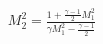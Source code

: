 \documentclass[10pt]{article}
\begin{document}
\begin{align*}M_{2}^{2}
=
\frac{1+ \frac{\gamma-1}{2} M_{1}^{2} }{ \gamma M_{1}^{2} - \frac{\gamma-1}{2} }\end{align*}
\end{document}

